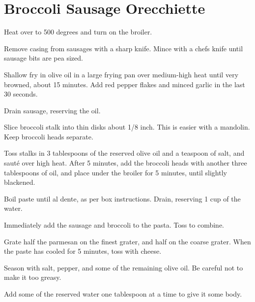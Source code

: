 

\section{Broccoli Sausage Orecchiette}
\begin{recipe}



Heat over to 500 degrees and turn on the broiler.

Remove casing from sausages with a sharp knife. Mince with a chefs knife until sausage bits are pea sized.

Shallow fry in olive oil in a large frying pan over medium-high heat until very browned, about 15 minutes. Add red pepper flakes and minced garlic in the last 30 seconds.

Drain sausage, reserving the oil.


Slice broccoli stalk into thin disks about 1/8 inch. This is easier with a  mandolin. Keep broccoli heads separate.

Toss stalks in 3 tablespoons of the reserved olive oil and a teaspoon of salt, and sauté over high heat. After 5 minutes, add the broccoli heads with another three tablespoons of oil, and place under the broiler for 5 minutes, until slightly blackened.


Boil paste until al dente, as per box instructions. Drain, reserving 1 cup of the water.

Immediately add the sausage and broccoli to the pasta. Toss to combine.


Grate half the parmesan on the finest grater, and half on the coarse grater. When the paste has cooled for 5 minutes, toss with cheese.

Season with salt, pepper, and some of the remaining olive oil. Be careful not to make it too greasy.

Add some of the reserved water one tablespoon at a time to give it some body.

\end{recipe}
